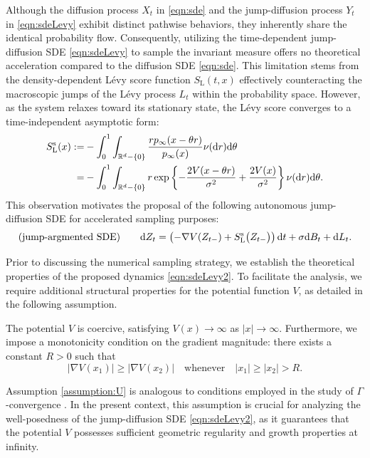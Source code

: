 Although the diffusion process $X_t$ in \eqref{eqn:sde} and the jump-diffusion process $Y_t$ in \eqref{eqn:sdeLevy} exhibit distinct pathwise behaviors, they inherently share the identical probability flow. Consequently, utilizing the time-dependent jump-diffusion SDE \eqref{eqn:sdeLevy} to sample the invariant measure offers no theoretical acceleration compared to the diffusion SDE \eqref{eqn:sde}. This limitation stems from the density-dependent L\'{e}vy score function $S_\mathrm{L}(t,x)$ effectively counteracting the macroscopic jumps of the L\'{e}vy process $L_t$ within the probability space. However, as the system relaxes toward its stationary state, the L\'{e}vy score converges to a time-independent asymptotic form:
\begin{equation} \label{eqn:stationaryLevyScore}
\begin{aligned}
    S^\mathrm{s}_\mathrm{L}(x):=& -\int_0^1\int_{\mathbb{R}^d-\{0\}} \frac{r p_\infty(x - \theta r)}{p_\infty(x)}\nu(\mathrm{d} r)\mathrm{d}\theta \\
    =& -\int_0^1\int_{\mathbb{R}^d-\{0\}} r\exp\left\{-\frac{2V(x- \theta r)}{\sigma^2} + \frac{2V(x)}{\sigma^2}\right\} \nu(\mathrm{d} r)\mathrm{d}\theta.
    \end{aligned}
\end{equation}
This observation motivates the proposal of the following autonomous jump-diffusion SDE for accelerated sampling purposes:
\begin{equation}\label{eqn:sdeLevy2}
(\mbox{jump-argmented SDE})\quad\quad    \mathrm{d} Z_t=\left(-\nabla V(Z_{t-}) + S^\mathrm{s}_\mathrm{L}\big( Z_{t-}\big) \right)\mathrm{d} t+ \sigma \mathrm{d} B_t + \mathrm{d} L_t.
\end{equation}

Prior to discussing the numerical sampling strategy, we establish the theoretical properties of the proposed dynamics \eqref{eqn:sdeLevy2}. To facilitate the analysis, we require additional structural properties for the potential function $V$, as detailed in the following assumption.

\begin{assumption}\label{assumption:U}
     The potential $V$ is coercive, satisfying $V(x)\to\infty$ as $|x|\to\infty$. Furthermore, we impose a monotonicity condition on the gradient magnitude: there exists a constant $R>0$ such that
     \[
     |\nabla V(x_1)|\geq|\nabla V(x_2)| \quad \text{whenever} \quad |x_1|\geq|x_2|>R.
     \]
\end{assumption}

\begin{remark}
    Assumption \ref{assumption:U} is analogous to conditions employed in the study of $\Gamma$-convergence \cite{lu2017gaussian}. In the present context, this assumption is crucial for analyzing the well-posedness of the jump-diffusion SDE \eqref{eqn:sdeLevy2}, as it guarantees that the potential $V$ possesses sufficient geometric regularity and growth properties at infinity.
\end{remark}

